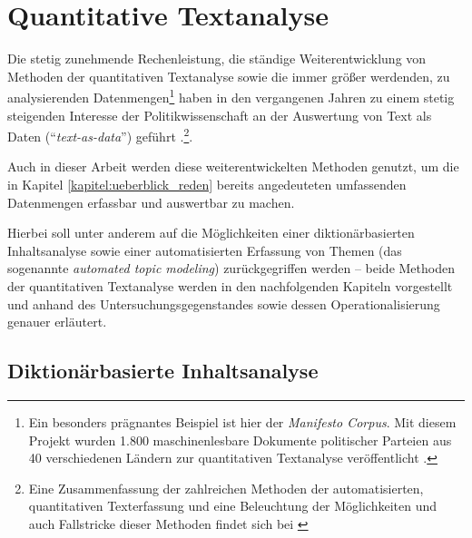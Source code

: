\documentclass[12pt, 
    twoside=false, 
    bibliography=totoc, 
    numbers=endperiod, 
    headings=normal, 
    toc=chapterentrydotfill
    ]{scrbook}
\begin{document}
\section{Quantitative Textanalyse}

Die stetig zunehmende Rechenleistung, die ständige Weiterentwicklung von Methoden der quantitativen Textanalyse sowie die immer größer werdenden, zu analysierenden Datenmengen\footnote{Ein besonders prägnantes Beispiel ist hier der \emph{Manifesto Corpus}. Mit diesem Projekt wurden 1.800 maschinenlesbare Dokumente politischer Parteien aus 40 verschiedenen Ländern zur quantitativen Textanalyse veröffentlicht \parencite{merz_2016}.} haben in den vergangenen Jahren zu einem stetig steigenden Interesse der Politikwissenschaft an der Auswertung von Text als Daten (\enquote{\emph{text-as-data}}) geführt \parencite[vgl.][]{wilkerson_2017}.\footnote{Eine Zusammenfassung der zahlreichen Methoden der automatisierten, quantitativen Texterfassung und eine Beleuchtung der Möglichkeiten und auch Fallstricke dieser Methoden findet sich bei \textcite{grimmer_2013}}. 

Auch in dieser Arbeit werden diese weiterentwickelten Methoden genutzt, um die in Kapitel \ref{kapitel:ueberblick_reden} bereits angedeuteten umfassenden Datenmengen  erfassbar und auswertbar zu machen.

Hierbei soll unter anderem auf die Möglichkeiten einer diktionärbasierten Inhaltsanalyse sowie einer automatisierten Erfassung von Themen (das sogenannte \emph{automated topic modeling}) zurückgegriffen werden -- beide Methoden der quantitativen Textanalyse werden in den nachfolgenden Kapiteln vorgestellt und anhand des Untersuchungsgegenstandes sowie dessen Operationalisierung genauer erläutert.


\subsection{Diktionärbasierte Inhaltsanalyse}\label{kapitel:diktionär}
\end{document}
